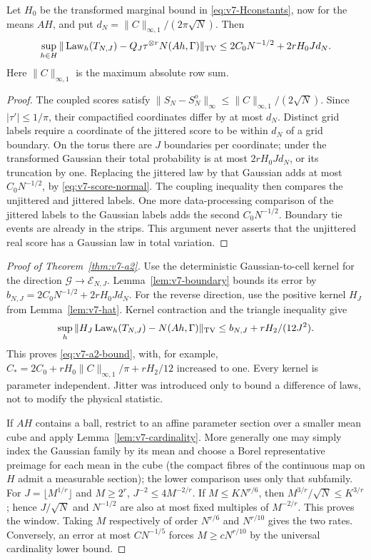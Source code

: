 \begin{lemma}\label{lem:v7-boundary}
Let $H_0$ be the transformed marginal bound in
\eqref{eq:v7-Hconstants}, now for the means $AH$, and put
$d_N=\|C\|_{\infty,1}/(2\pi\sqrt N)$. Then
\begin{equation}
 \sup_{h\in H}\|\operatorname{Law}_h(T_{N,J})-
                   Q_J\tau^{\otimes r}N(Ah,\Gamma)\|_{\rm TV}
           \le 2C_0N^{-1/2}+2rH_0Jd_N.                \label{eq:v7-boundary}
\end{equation}
Here $\|C\|_{\infty,1}$ is the maximum absolute row sum.
\end{lemma}
\begin{proof}
The coupled scores satisfy
$\|S_N-S_N^o\|_\infty\le\|C\|_{\infty,1}/(2\sqrt N)$.
Since $|\tau'|\le1/\pi$, their compactified coordinates differ by
at most $d_N$. Distinct grid labels require a coordinate of the jittered
score to be within $d_N$ of a grid boundary. On the torus there are $J$
boundaries per coordinate; under the transformed Gaussian their total
probability is at most $2rH_0Jd_N$, or its truncation by one. Replacing
the jittered law by that Gaussian adds at most $C_0N^{-1/2}$, by
\eqref{eq:v7-score-normal}. The coupling inequality then compares the
unjittered and jittered labels. One more data-processing comparison of
the jittered labels to the Gaussian labels adds the second
$C_0N^{-1/2}$. Boundary tie events are already in the strips. This
argument never asserts that the unjittered real score has a Gaussian
law in total variation.
\end{proof}

\begin{proof}[Proof of Theorem~\ref{thm:v7-a2}]
Use the deterministic Gaussian-to-cell kernel for the direction
$\mathcal G\to\mathcal E_{N,J}$. Lemma~\ref{lem:v7-boundary} bounds
its error by $b_{N,J}=2C_0N^{-1/2}+2rH_0Jd_N$.
For the reverse direction, use the positive kernel $H_J$ from
Lemma~\ref{lem:v7-hat}. Kernel contraction and the triangle inequality
give
\[
 \sup_h\|H_J\operatorname{Law}_h(T_{N,J})-N(Ah,\Gamma)\|_{\rm TV}
           \le b_{N,J}+rH_2/(12J^2).
\]
This proves \eqref{eq:v7-a2-bound}, with, for example,
$C_*=2C_0+rH_0\|C\|_{\infty,1}/\pi+rH_2/12$ increased to one.
Every kernel is parameter independent. Jitter was introduced only to
bound a difference of laws, not to modify the physical statistic.

If $AH$ contains a ball, restrict to an affine parameter section over
a smaller mean cube and apply Lemma~\ref{lem:v7-cardinality}. More
generally one may simply index the Gaussian family by its mean and
choose a Borel representative preimage for each mean in the cube
(the compact fibres of the continuous map on $H$ admit a measurable
section); the lower
comparison uses only that subfamily. For $J=\lfloor M^{1/r}\rfloor$
and $M\ge2^r$, $J^{-2}\le4M^{-2/r}$. If $M\le K N^{r/6}$, then
$M^{3/r}/\sqrt N\le K^{3/r}$; hence $J/\sqrt N$ and $N^{-1/2}$
are also at most fixed multiples of $M^{-2/r}$. This proves the
window. Taking $M$ respectively of order $N^{r/6}$ and $N^{r/10}$
gives the two rates. Conversely, an error at most $C N^{-1/5}$ forces
$M\ge c N^{r/10}$ by the universal cardinality lower bound.
\end{proof}

